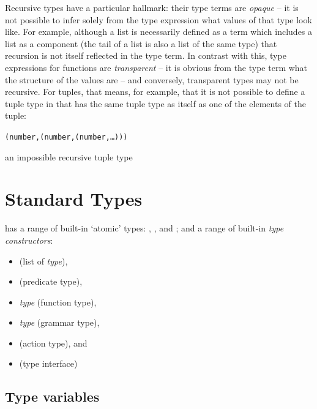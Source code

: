Recursive types have a particular hallmark: their type terms are \emph{opaque} -- it is not possible to infer solely from the type expression what values of that type look like. For example, although a list is necessarily defined as a term which includes a list as a component (the tail of a list is also a list of the same type) that recursion is not itself reflected in the  type term. In contrast with this, type expressions for functions are \emph{transparent} -- it is obvious from the type term what the structure of the values are -- and conversely, transparent types may not be recursive. For tuples, that means, for example, that it is not possible to define a tuple type in \go that has the same tuple type as itself as one of the elements of the tuple:
\begin{example}
\begin{boxed}
\begin{alltt}
( number, ( number, ( number, \ldots)))
\end{alltt}
\end{boxed}
\caption{\label{recursive:tuple}an impossible recursive tuple type}
\end{example}

\section{Standard Types}
\label{types:types}
\go has a range of built-in `atomic' types:  , ,  and ; and a range of built-in \emph{type constructors}:
\begin{itemize}
\item
{} (list of \emph{type}), 
\item
{} (predicate type), 
\item
{}\emph{type} (function type), 
\item
{}\emph{type} (grammar type),
\item
{} (action type), and
\item
{} (type interface)
\end{itemize}

\subsection{Type variables}
\label{types:standard:variable}

